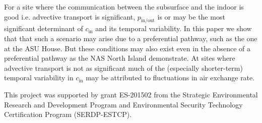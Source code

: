 \documentclass[journal=esthag,manuscript=article]{achemso}
\begin{document}
For a site where the communication between the subsurface and the indoor is good i.e. advective transport is significant, $p_\mathrm{in/out}$ is or may be the most significant determinant of $c_\mathrm{in}$ and its temporal variability.
In this paper we show that that such a scenario may arise due to a preferential pathway, such as the one at the ASU House.
But these conditions may also exist even in the absence of a preferential pathway as the NAS North Island demonstrate.
At sites where advective transport is not as significant much of the (especially shorter-term) temporal variability in $c_\mathrm{in}$ may be attributed to fluctuations in air exchange rate.

\begin{acknowledgement}
 This project was supported by grant ES-201502 from the Strategic Environmental Research and Development Program and Environmental Security Technology Certification Program (SERDP-ESTCP).
\end{acknowledgement}


\end{document}
